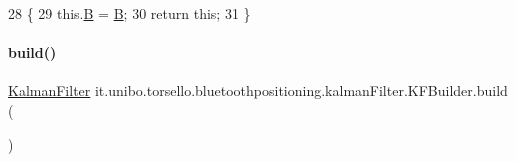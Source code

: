\begin{DoxyCode}
28                                  \{
29         this.\hyperlink{classit_1_1unibo_1_1torsello_1_1bluetoothpositioning_1_1kalmanFilter_1_1KFBuilder_a0659c3648f664458d627741edf1de5a4_a0659c3648f664458d627741edf1de5a4}{B} = \hyperlink{classit_1_1unibo_1_1torsello_1_1bluetoothpositioning_1_1kalmanFilter_1_1KFBuilder_a0659c3648f664458d627741edf1de5a4_a0659c3648f664458d627741edf1de5a4}{B};
30         \textcolor{keywordflow}{return} \textcolor{keyword}{this};
31     \}
\end{DoxyCode}
\hypertarget{classit_1_1unibo_1_1torsello_1_1bluetoothpositioning_1_1kalmanFilter_1_1KFBuilder_ac4ac30ce0fabe2bf72a54ae1b737f587_ac4ac30ce0fabe2bf72a54ae1b737f587}{}\label{classit_1_1unibo_1_1torsello_1_1bluetoothpositioning_1_1kalmanFilter_1_1KFBuilder_ac4ac30ce0fabe2bf72a54ae1b737f587_ac4ac30ce0fabe2bf72a54ae1b737f587} 
\paragraph{\texorpdfstring{build()}{build()}}
{\footnotesize\ttfamily \hyperlink{classit_1_1unibo_1_1torsello_1_1bluetoothpositioning_1_1kalmanFilter_1_1KalmanFilter}{Kalman\+Filter} it.\+unibo.\+torsello.\+bluetoothpositioning.\+kalman\+Filter.\+K\+F\+Builder.\+build (\begin{DoxyParamCaption}{ }\end{DoxyParamCaption})}


